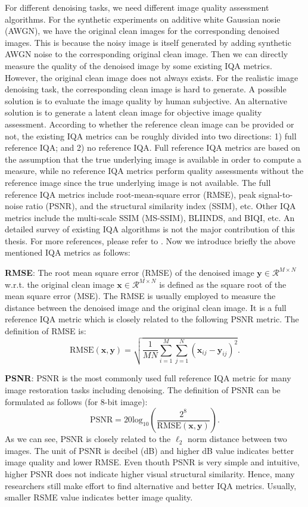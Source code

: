 For different denoising tasks, we need different image quality assessment algorithms. For the synthetic experiments on additive white Gaussian nosie (AWGN), we have the original clean images for the corresponding denoised images. This is because the noisy image is itself generated by adding synthetic AWGN noise to the corresponding original clean image. Then we can directly measure the quality of the denoised image by some existing IQA metrics. However, the original clean image does not always exists. For the realistic image denoising task, the corresponding clean image is hard to generate. A possible solution is to evaluate the image quality by human subjective. An alternative solution is to generate a latent clean image for objective image quality assessment. According to whether the reference clean image can be provided or not, the existing IQA metrics can be roughly divided into two directions: 1) full reference IQA; and 2) no reference IQA. Full reference IQA metrics are based on the assumption that the true underlying image is available in order to compute a measure, while no reference IQA metrics perform quality assessments without the reference image since the true underlying image is not available. The full reference IQA metrics include root-mean-square error (RMSE), peak signal-to-noise ratio (PSNR), and the structural similarity index (SSIM), etc. Other IQA metrics include the multi-scale SSIM (MS-SSIM), BLIINDS, and BIQI, etc. An detailed survey of existing IQA algorithms is not the major contribution of this thesis. For more references, please refer to \cite{ssim}. Now we introduce briefly the above mentioned IQA metrics as follows:

\textbf{RMSE}: The root mean square error (RMSE) of the denoised image $\bm{y}\in\mathcal{R}^{M\times N}$ w.r.t. the original clean image $\bm{x}\in\mathcal{R}^{M\times N}$ is defined as the square root of the mean square error (MSE). The RMSE is usually employed to measure the distance between the denoised image and the original clean image. It is a full reference IQA metric which is closely related to the following PSNR metric. The definition of RMSE is:
\begin{equation}
\label{e13}
\text{RMSE}(\bm{x},\bm{y})
=
\sqrt{\frac{1}{MN}\sum_{i=1}^{M}\sum_{j=1}^{N}(\bm{x}_{ij}-\bm{y}_{ij})^{2}}.
\end{equation}



\textbf{PSNR}: PSNR is the most commonly used full reference IQA metric for many image restoration tasks including denoising. The definition of PSNR can be formulated as follows (for 8-bit image):
\begin{equation}
\label{e14}
\text{PSNR}
=
20\text{log}_{10}
(\frac{2^{8}}{\text{RMSE}(\bm{x},\bm{y})}).
\end{equation}
As we can see, PSNR is closely related to the $\ell_{2}$ norm distance between two images. The unit of PSNR is decibel (dB) and higher dB value indicates better image quality and lower RMSE. Even thouth PSNR is very simple and intuitive, higher PSNR does not indicate higher visual structural similarity. Hence, many researchers still make effort to find alternative and better IQA metrics. Usually, smaller RSME value indicates better image quality. 

